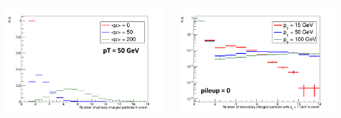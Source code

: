 \documentclass{beamer}
\begin{document}
\begin{frame}
\begin{columns}
\begin{column}{.09\textwidth}
\end{column}
\begin{column}{.41\textwidth}
\centering
\includegraphics[width=\textwidth]{Tracking/nPrimaryChargedTruth}
\end{column}
\begin{column}{.41\textwidth}
\centering
\includegraphics[width=\textwidth]{Tracking/nSecondaryChargedTruth1GeV_pt}
\end{column}
\begin{column}{.09\textwidth}
\end{column}
\end{columns}
\end{frame}
\end{document}
